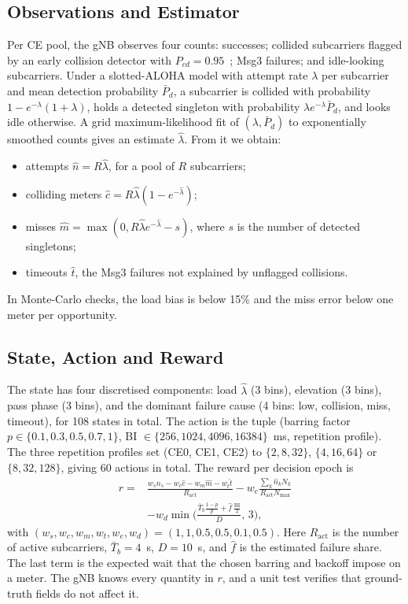 \documentclass[conference]{IEEEtran}
\begin{document}
\subsection{Observations and Estimator}
Per CE pool, the gNB observes four counts: successes; collided subcarriers flagged by an early collision detector with $P_{cd}=0.95$~\cite{jeong2025mtecd,jeong2026isc}; Msg3 failures; and idle-looking subcarriers. Under a slotted-ALOHA model with attempt rate $\lambda$ per subcarrier and mean detection probability $\bar P_d$, a subcarrier is collided with probability $1-e^{-\lambda}(1+\lambda)$, holds a detected singleton with probability $\lambda e^{-\lambda}\bar P_d$, and looks idle otherwise. A grid maximum-likelihood fit of $(\lambda,\bar P_d)$ to exponentially smoothed counts gives an estimate $\hat\lambda$. From it we obtain:
\begin{itemize}
\item attempts $\hat n=R\hat\lambda$, for a pool of $R$ subcarriers;
\item colliding meters $\hat c=R\hat\lambda(1-e^{-\hat\lambda})$;
\item misses $\hat m=\max(0,R\hat\lambda e^{-\hat\lambda}-s)$, where $s$ is the number of detected singletons;
\item timeouts $\hat t$, the Msg3 failures not explained by unflagged collisions.
\end{itemize}
In Monte-Carlo checks, the load bias is below 15\% and the miss error below one meter per opportunity.

\subsection{State, Action and Reward}
The state has four discretised components: load $\hat\lambda$ (3 bins), elevation (3 bins), pass phase (3 bins), and the dominant failure cause (4 bins: low, collision, miss, timeout), for 108 states in total. The action is the tuple (barring factor $p\in\{0.1,0.3,0.5,0.7,1\}$, BI $\in\{256,1024,4096,16384\}$~ms, repetition profile). The three repetition profiles set (CE0, CE1, CE2) to $\{2,8,32\}$, $\{4,16,64\}$ or $\{8,32,128\}$, giving 60 actions in total. The reward per decision epoch is
\begin{equation}
\begin{aligned}
r={}&\frac{w_s n_s-w_c\hat c-w_m\hat m-w_t\hat t}{R_{\mathrm{act}}}-w_e\frac{\sum_k \hat n_k N_k}{R_{\mathrm{act}}N_{\max}}\\
&-w_d\min\!\Big(\frac{\bar T_b\frac{1-p}{p}+\hat f\,\frac{\mathrm{BI}}{2}}{D},\,3\Big),
\end{aligned}
\end{equation}
with $(w_s,w_c,w_m,w_t,w_e,w_d)=(1,1,0.5,0.5,0.1,0.5)$. Here $R_{\mathrm{act}}$ is the number of active subcarriers, $\bar T_b=4$~s, $D=10$~s, and $\hat f$ is the estimated failure share. The last term is the expected wait that the chosen barring and backoff impose on a meter. The gNB knows every quantity in $r$, and a unit test verifies that ground-truth fields do not affect it.
\end{document}
